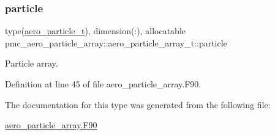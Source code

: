 \subsubsection{\texorpdfstring{particle}{particle}}
{\footnotesize\ttfamily type(\mbox{\hyperlink{structpmc__aero__particle_1_1aero__particle__t}{aero\+\_\+particle\+\_\+t}}), dimension(\+:), allocatable pmc\+\_\+aero\+\_\+particle\+\_\+array\+::aero\+\_\+particle\+\_\+array\+\_\+t\+::particle}



Particle array. 



Definition at line 45 of file aero\+\_\+particle\+\_\+array.\+F90.



The documentation for this type was generated from the following file\+:\begin{DoxyCompactItemize}
\item 
\mbox{\hyperlink{aero__particle__array_8_f90}{aero\+\_\+particle\+\_\+array.\+F90}}\end{DoxyCompactItemize}
